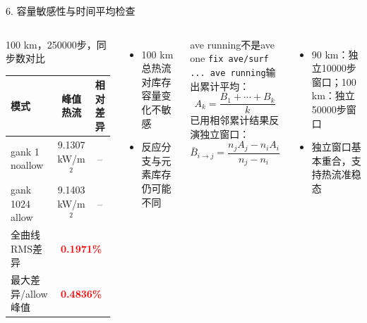 \documentclass[aspectratio=169,11pt]{ctexbeamer}
\newcommand{\keynum}[1]{\textcolor{red}{\bfseries #1}}
\begin{document}
\begin{frame}{6. 容量敏感性与时间平均检查}
  \small
  \begin{columns}[T,totalwidth=\textwidth]
    \begin{block}{100 km，250000步，同步数对比}
      \begin{tabular}{lcc}
        \toprule
        模式 & 峰值热流 & 相对差异 \\
        \midrule
        gank 1 noallow & 9.1307 kW/m$^2$ & -- \\
        gank 1024 allow & 9.1403 kW/m$^2$ & -- \\
        \midrule
        全曲线RMS差异 & \multicolumn{2}{c}{\keynum{0.1971\%}} \\
        最大差异/allow峰值 & \multicolumn{2}{c}{\keynum{0.4836\%}} \\
        \bottomrule
      \end{tabular}
    \end{block}
    \begin{itemize}
      \item 100 km总热流对库存容量变化不敏感
      \item 反应分支与元素库存仍可能不同
    \end{itemize}
    \begin{block}{ave running不是ave one}
      \texttt{fix ave/surf ... ave running}输出累计平均：
      \[
        A_k=\frac{B_1+\cdots+B_k}{k}
      \]
      已用相邻累计结果反演独立窗口：
      \[
        \bar B_{i\rightarrow j}=\frac{n_jA_j-n_iA_i}{n_j-n_i}
      \]
    \end{block}
    \begin{itemize}
      \item 90 km：独立10000步窗口；100 km：独立50000步窗口
      \item 独立窗口基本重合，支持热流准稳态
    \end{itemize}
  \end{columns}
\end{frame}
\end{document}
